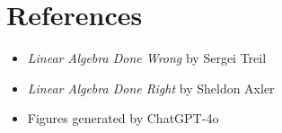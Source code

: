 \chapter{References}
\begin{itemize}
    \vspace{-30pt}
    \item \textit{Linear Algebra Done Wrong} by Sergei Treil
    \item \textit{Linear Algebra Done Right} by Sheldon Axler
    \item Figures generated by ChatGPT-4o
\end{itemize}